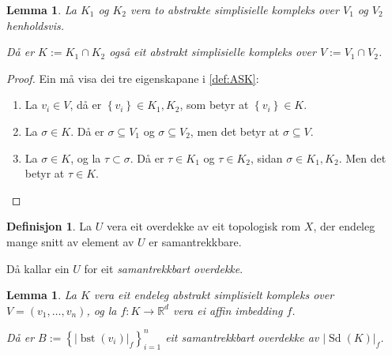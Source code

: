\documentclass[a4paper, 12pt, norsk]{article}
\theoremstyle{plain}
\newtheorem{lemma}[theorem]{Lemma}
\theoremstyle{definition}
\newtheorem{definition}[theorem]{Definisjon}
\newcommand{\Rb}{\mathbb{R}}
\newcommand{\intersect}{ \mathop{\cap}\limits }
\newcommand{\gr}[1]{ \lvert #1 \rvert } %
\newcommand{\set}[1]{ \left\{ #1 \right\} } %
\DeclareMathOperator{\Sd}{Sd} %
\DeclareMathOperator{\bst}{bst} %
\begin{document}
\begin{lemma} \label{thm:snitt-av-ASK-er-ASK}
	La \( K_1 \) og \( K_2 \) vera to abstrakte simplisielle kompleks over \( V_1 \) og \( V_2 \) henholdsvis. 
	
	Då er \( K := K_1 \intersect K_2 \) også eit abstrakt simplisielle kompleks over \( V := V_1 \intersect V_2 \).
\end{lemma}

\begin{proof}
	Ein må visa dei tre eigenskapane i \autoref{def:ASK}:
	\begin{enumerate}
		\item La \( v_i \in V \), då er \( \set{v_i} \in K_1, K_2 \), som betyr at \( \set{v_i} \in K \).
  		\item La \( \sigma \in K \). Då er \( \sigma \subseteq V_1 \) og \( \sigma \subseteq V_2 \), men det betyr at \( \sigma \subseteq V \).
    	\item La \( \sigma \in K \), og la \( \tau \subset \sigma \). Då er \( \tau \in K_1 \) og \( \tau \in K_2 \), sidan \( \sigma \in K_1, K_2 \). Men det betyr at \( \tau \in K \).
	\end{enumerate}
\end{proof}

\begin{definition}
	La \( U \) vera eit overdekke av eit topologisk rom \( X \), der endeleg mange snitt av element av \( U \) er samantrekkbare. 
	
	Då kallar ein \( U \) for eit \emph{samantrekkbart overdekke}.
\end{definition}

\begin{lemma} \label{thm:bst-good}
	La \( K \) vera eit endeleg abstrakt simplisielt kompleks over \( V = (v_1, \dots, v_n) \), og la \( f: K \to \Rb^d \) vera ei affin imbedding \( f \). 
	
	Då er \( B := \set{\gr{\bst(v_i)}_f}_{i=1}^{n} \) eit samantrekkbart overdekke av \( \gr{\Sd(K)}_f \).
\end{lemma}
\end{document}
